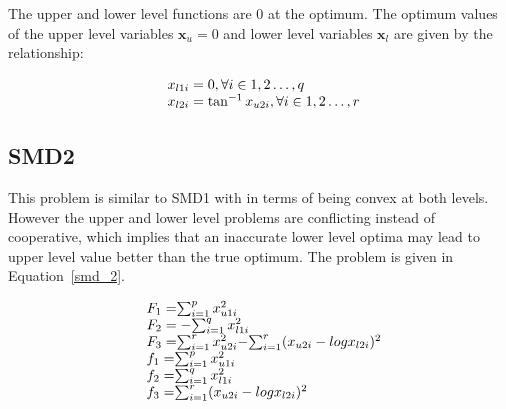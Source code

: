 The upper and lower level functions are 0 at the optimum. The optimum values of the upper level variables $\mathbf{x}_u=0$ and lower level variables $\mathbf{x}_l$ are given by the relationship: 

\begin{equation}
\begin{array}{lr}
\text{}\hspace{2mm} x_{l1i}=0,  \forall i \in {1,2\ldots,q} \\
\text{}\hspace{2mm} x_{l2i}=\tan^{-1} x_{u2i},  \forall i \in {1,2\ldots,r} \\
\end{array}
\label{basic_1}
\end{equation}

\subsection{SMD2}

This problem is similar to SMD1 with in terms of being convex at both levels. However the upper and lower level problems are conflicting instead of cooperative, which implies that an inaccurate lower level optima may lead to upper level value better than the true optimum. The problem is given in Equation~\ref{smd_2}.

\begin{equation}
\begin{array}{lr}
\text{}\hspace{2mm} F_1=$$\sum_{	i=1}^{p} x_{u1i}^{2} $$\\
\text{}\hspace{2mm} F_2=-$$\sum_{	i=1}^{q} x_{l1i}^{2} $$\\
\text{}\hspace{2mm} F_3=$$\sum_{	i=1}^{r} x_{u2i}^{2} $$-$$\sum_{	i=1}^{r} (x_{u2i}-log x_{l2i})^{2} $$\\

\text{}\hspace{2mm} f_1=$$\sum_{	i=1}^{p} x_{u1i}^{2} $$\\
\text{}\hspace{2mm} f_2=$$\sum_{	i=1}^{q} x_{l1i}^{2} $$\\
\text{}\hspace{2mm} f_3=$$\sum_{	i=1}^{r} (x_{u2i}-log x_{l2i})^{2} $$\\

\end{array}
\label{smd_2}
\end{equation}



